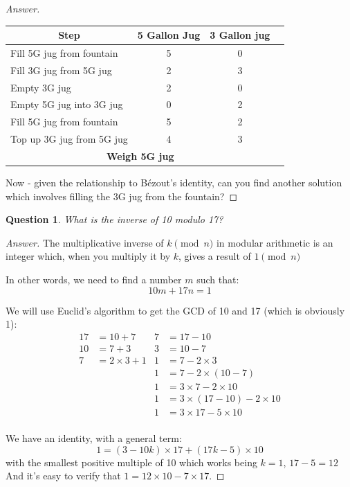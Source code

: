 \documentclass{article}
\newcommand*{\thead}[1]{\multicolumn{1}{|c|}{\bfseries #1}}
\newtheorem{question}{Question}
\begin{document}
\begin{proof}[Answer]
	\vspace{1em}

	\begin{tabular}{|l|c|c|r|}
		\hline
		\thead{Step} & \thead{5 Gallon Jug} & \thead{3 Gallon jug}\\
		\hline
		Fill 5G jug from fountain & 5 & 0 \\
		Fill 3G jug from 5G jug & 2 & 3 \\
		Empty 3G jug & 2 & 0 \\
		Empty 5G jug into 3G jug & 0 & 2 \\
		Fill 5G jug from fountain & 5 & 2 \\
		Top up 3G jug from 5G jug & 4 & 3 \\
		\hline
		\multicolumn{3}{|c|}{\bfseries Weigh 5G jug} \\
		\hline
	\end{tabular}
	
	\vspace{1em}

	Now - given the relationship to B\'ezout's identity, can you find
	another solution which involves filling the 3G jug from the fountain?


\end{proof}

\begin{question}
What is the inverse of 10 modulo 17?
\end{question}

\begin{proof}[Answer]
	The multiplicative inverse of $k \pmod{n}$ in modular arithmetic is an integer which, when you
	multiply it by $k$, gives a result of $1 \pmod{n}$

	In other words, we need to find a number $m$ such that:
	\[ 10m + 17n = 1 \]

	We will use Euclid's algorithm to get the GCD of 10 and 17 (which is obviously 1):
	\begin{align*}
		17 &= 10 + 7 & 7 &= 17 - 10 \\
		10 &= 7 + 3  & 3 &= 10 - 7 \\
		7 &= 2 \times 3 + 1 & 1 &= 7 - 2 \times 3 \\
		&& 1 &= 7 - 2 \times (10 - 7) \\
		&& 1 &= 3 \times 7 - 2 \times 10 \\
		&& 1 &= 3 \times (17 - 10) - 2 \times 10 \\
		&& 1 &= 3 \times 17 - 5 \times 10 \\
	\end{align*}
	
	We have an identity, with a general term: 
	\[ 1  = (3 - 10k) \times 17 + (17k-5) \times 10 \]
	with the smallest positive multiple of 10 which works being $k=1$, $17-5 = 12$
	And it's easy to verify that $1 = 12\times10 - 7\times17$.
\end{proof}
\end{document}
